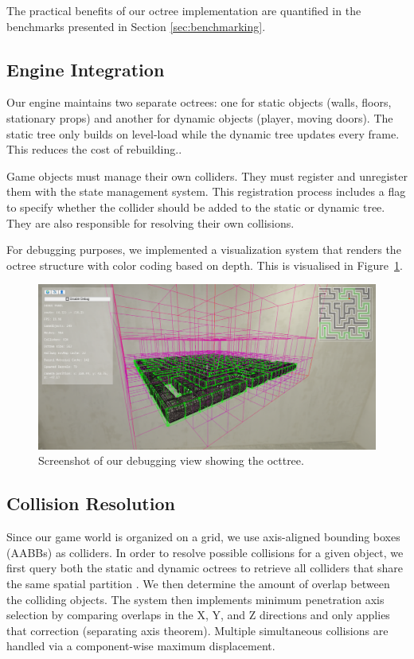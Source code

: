 \documentclass{article}
\begin{document}
The practical benefits of our octree implementation are quantified in the
benchmarks presented in Section \ref{sec:benchmarking}.

\subsection{Engine Integration}
Our engine maintains two separate octrees: one for static objects (walls,
floors, stationary props) and another for dynamic objects (player, moving
doors). The static tree only builds on level-load while the dynamic tree
updates every frame. This reduces the cost of rebuilding..

Game objects must manage their own colliders. They must register
and unregister them with the state management system. This registration process
includes a flag to specify whether the collider should be added to the static
or dynamic tree. They are also responsible for resolving their own collisions.

For debugging purposes, we implemented a visualization system that renders the
octree structure with color coding based on depth.  This is visualised in
Figure~\ref{fig:octree}.

\begin{figure}[H]
    \centering
    \includegraphics[width=\textwidth]{diagrams/octree.png}
    \caption{Screenshot of our debugging view showing the octtree.}
    \label{fig:octree}
\end{figure}

\subsection{Collision Resolution}

Since our game world is organized on a grid, we use axis-aligned bounding boxes
(AABBs) as colliders. In order to resolve possible collisions for a given
object, we first query both the static and dynamic octrees to retrieve all
colliders that share the same spatial partition . We then determine the amount
of overlap between the colliding objects. The system then implements minimum
penetration axis selection by comparing overlaps in the X, Y, and Z directions
and only applies that correction (separating axis theorem). Multiple
simultaneous collisions are handled via a component-wise maximum displacement.
\end{document}

